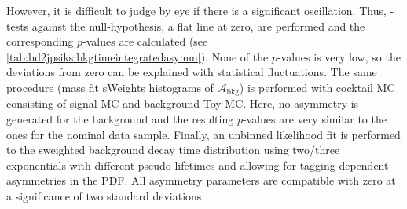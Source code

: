 However, it is difficult to judge by eye if there is a significant
oscillation. Thus, \chisq-tests against the null-hypothesis, \ie a flat line
at zero, are performed and the corresponding $p$-values are calculated (see
\cref{tab:bd2jpsiks:bkgtimeintegratedasymm}). None of the $p$-values is very
low, so the deviations from zero can be explained with statistical
fluctuations. The same procedure (mass fit \to sWeights \to histograms of
$\mathcal{A}_{\text{bkg}}$) is performed with cocktail MC consisting of signal
MC and background Toy MC. Here, no asymmetry is generated for
the background and the resulting $p$-values are very similar to the ones for
the nominal data sample. Finally, an unbinned likelihood fit is performed to
the sweighted background decay time distribution using two/three exponentials
with different pseudo-lifetimes and allowing for tagging-dependent asymmetries
in the PDF. All asymmetry parameters are compatible with zero at a
significance of two standard deviations.
